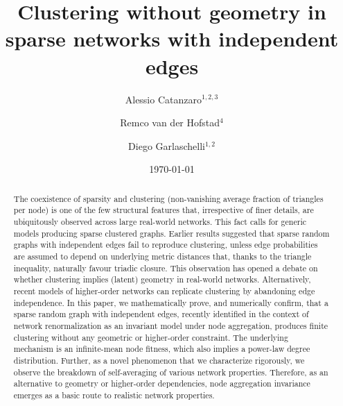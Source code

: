\documentclass[ twocolumn,
 amsmath,amssymb,
 aps, pre, amsthm, amsfonts,
]{revtex4-2}
\begin{document}
\title{Clustering without geometry in sparse networks with independent edges}


\date{\today}

\author{Alessio Catanzaro$^{1,2,3}$}
\author{Remco van der Hofstad$^4$}
\author{Diego Garlaschelli$^{1,2}$}

%




\begin{abstract}
The coexistence of sparsity and clustering (non-vanishing average fraction of triangles per node) is one of the few structural features that, irrespective of finer details, are ubiquitously observed across large real-world networks. This fact calls for generic models  producing sparse clustered graphs. 
Earlier results suggested that sparse random graphs with independent edges fail to reproduce clustering, unless edge probabilities are assumed to depend on underlying metric distances that, thanks to the triangle inequality, naturally favour triadic closure. 
This observation has opened a debate on whether clustering implies (latent) geometry in real-world networks. 
Alternatively, recent models of higher-order networks can replicate clustering by abandoning edge independence.
In this paper, we mathematically prove, and numerically confirm, that a sparse random graph with independent edges, recently identified in the context of network renormalization as an invariant model under node aggregation, produces finite clustering without any geometric or higher-order constraint.
The underlying mechanism is an infinite-mean node fitness, which also implies a power-law degree distribution. Further, as a novel phenomenon that we characterize rigorously, we observe the breakdown of self-averaging of various network properties.
Therefore, as an alternative to geometry or higher-order dependencies, node aggregation invariance emerges as a basic route to realistic network properties.
\end{abstract}
\end{document}
